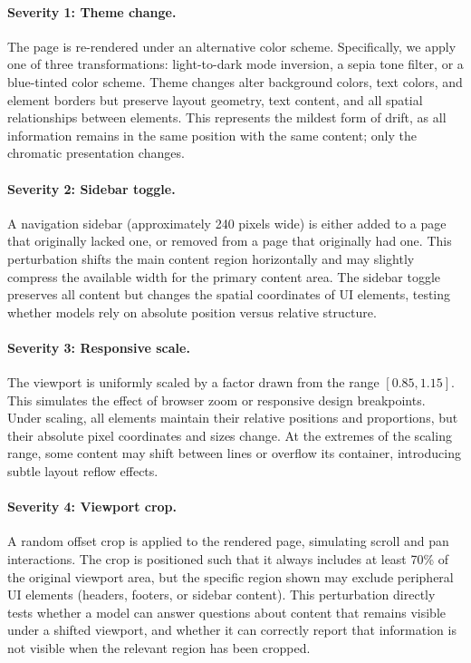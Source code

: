 \paragraph{Severity 1: Theme change.}
The page is re-rendered under an alternative color scheme. Specifically, we apply one of three transformations: light-to-dark mode inversion, a sepia tone filter, or a blue-tinted color scheme. Theme changes alter background colors, text colors, and element borders but preserve layout geometry, text content, and all spatial relationships between elements. This represents the mildest form of drift, as all information remains in the same position with the same content; only the chromatic presentation changes.

\paragraph{Severity 2: Sidebar toggle.}
A navigation sidebar (approximately 240 pixels wide) is either added to a page that originally lacked one, or removed from a page that originally had one. This perturbation shifts the main content region horizontally and may slightly compress the available width for the primary content area. The sidebar toggle preserves all content but changes the spatial coordinates of UI elements, testing whether models rely on absolute position versus relative structure.

\paragraph{Severity 3: Responsive scale.}
The viewport is uniformly scaled by a factor drawn from the range $[0.85, 1.15]$. This simulates the effect of browser zoom or responsive design breakpoints. Under scaling, all elements maintain their relative positions and proportions, but their absolute pixel coordinates and sizes change. At the extremes of the scaling range, some content may shift between lines or overflow its container, introducing subtle layout reflow effects.

\paragraph{Severity 4: Viewport crop.}
A random offset crop is applied to the rendered page, simulating scroll and pan interactions. The crop is positioned such that it always includes at least 70\% of the original viewport area, but the specific region shown may exclude peripheral UI elements (headers, footers, or sidebar content). This perturbation directly tests whether a model can answer questions about content that remains visible under a shifted viewport, and whether it can correctly report that information is not visible when the relevant region has been cropped.

